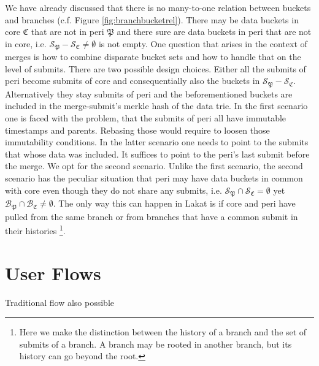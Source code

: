 \documentclass[14pt]{article}
\begin{document}
We have already discussed that there is no many-to-one relation between buckets and branches (c.f. Figure \ref{fig:branchbucketrel}). There may be data buckets in core $\mathfrak C$ that are not in peri $\mathfrak P$ and there sure are data buckets in peri that are not in core, i.e. $\mathcal S_{\mathfrak P}-\mathcal S_{\mathfrak C}\neq \emptyset$ is not empty. 
One question that arises in the context of merges is how to combine disparate bucket sets and how to handle that on the level of submits. There are two possible design choices. Either all the submits of peri become submits of core and consequentially also the buckets in $\mathcal S_{\mathfrak P}-\mathcal S_{\mathfrak C}$. Alternatively they stay submits of peri and the beforementioned buckets are included in the merge-submit's merkle hash of the data trie. In the first scenario one is faced with the problem, that the submits of peri all have immutable timestamps and parents. Rebasing those would require to loosen those immutability conditions. In the latter scenario one needs to point to the submits that whose data was included. It suffices to point to the peri's last submit before the merge. We opt for the second scenario. Unlike the first scenario, the second scenario has the peculiar situation that peri may have data buckets in common with core even though they do not share any submits, i.e. $\mathcal S_{\mathfrak P}\cap\mathcal S_{\mathfrak C}= \emptyset$ yet $\mathcal B_{\mathfrak P}\cap\mathcal B_{\mathfrak C}\neq \emptyset$. The only way this can happen in Lakat is if core and peri have pulled from the same branch or from branches that have a common submit in their histories \footnote{Here we make the distinction between the history of a branch and the set of submits of a branch. A branch may be rooted in another branch, but its history can go beyond the root.}. 

% 
% 
% 
% 
% 
% 



\section{User Flows}


Traditional flow also possible
\end{document}
